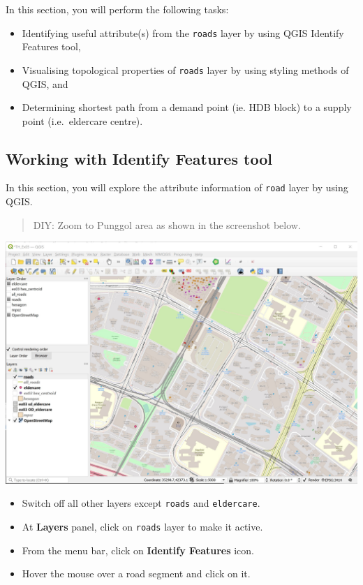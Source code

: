 \documentclass[
  letterpaper,
  DIV=11,
  numbers=noendperiod]{scrreprt}
\providecommand{\tightlist}{%
  \setlength{\itemsep}{0pt}\setlength{\parskip}{0pt}}\usepackage{longtable,booktabs,array}
\begin{document}
In this section, you will perform the following tasks:

\begin{itemize}
\tightlist
\item
  Identifying useful attribute(s) from the \texttt{roads} layer by using
  QGIS Identify Features tool,
\item
  Visualising topological properties of \texttt{roads} layer by using
  styling methods of QGIS, and
\item
  Determining shortest path from a demand point (ie. HDB block) to a
  supply point (i.e.~eldercare centre).
\end{itemize}

\hypertarget{working-with-identify-features-tool-1}{%
\subsection{Working with Identify Features
tool}\label{working-with-identify-features-tool-1}}

In this section, you will explore the attribute information of
\texttt{road} layer by using QGIS.

\begin{quote}
DIY: Zoom to Punggol area as shown in the screenshot below.
\end{quote}

\includegraphics{./img09/image6.jpg}

\begin{itemize}
\item
  Switch off all other layers except \texttt{roads} and
  \texttt{eldercare}.
\item
  At \textbf{Layers} panel, click on \texttt{roads} layer to make it
  active.
\item
  From the menu bar, click on \textbf{Identify Features} icon.
\item
  Hover the mouse over a road segment and click on it.
\end{itemize}
\end{document}
